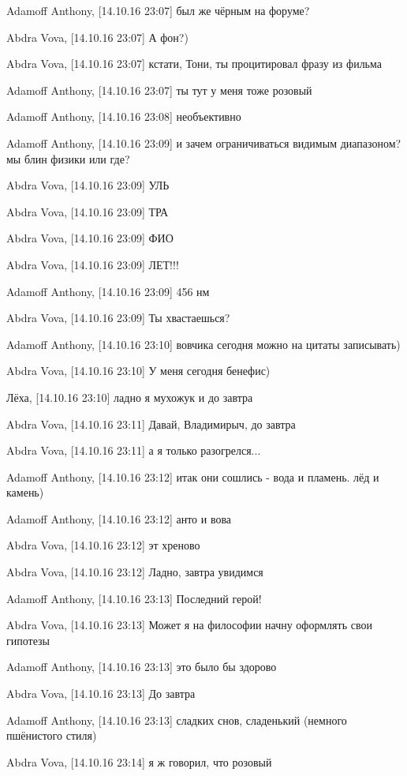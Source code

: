 Adamoff Anthony, [14.10.16 23:07]
был же чёрным на форуме?

Abdra Vova, [14.10.16 23:07]
А фон?)

Abdra Vova, [14.10.16 23:07]
кстати, Тони, ты процитировал фразу из фильма

Adamoff Anthony, [14.10.16 23:07]
ты тут у меня тоже розовый

Adamoff Anthony, [14.10.16 23:08]
необъективно

Adamoff Anthony, [14.10.16 23:09]
и зачем ограничиваться видимым диапазоном? мы блин физики или где?

Abdra Vova, [14.10.16 23:09]
УЛЬ

Abdra Vova, [14.10.16 23:09]
ТРА

Abdra Vova, [14.10.16 23:09]
ФИО

Abdra Vova, [14.10.16 23:09]
ЛЕТ!!!

Adamoff Anthony, [14.10.16 23:09]
456 нм

Abdra Vova, [14.10.16 23:09]
Ты хвастаешься?

Adamoff Anthony, [14.10.16 23:10]
вовчика сегодня можно на цитаты записывать)

Abdra Vova, [14.10.16 23:10]
У меня сегодня бенефис)

Лёха, [14.10.16 23:10]
ладно я мухожук
и до завтра

Abdra Vova, [14.10.16 23:11]
Давай, Владимирыч, до завтра

Abdra Vova, [14.10.16 23:11]
а я только разогрелся...

Adamoff Anthony, [14.10.16 23:12]
итак они сошлись - вода и пламень. лёд и камень)

Adamoff Anthony, [14.10.16 23:12]
анто и вова

Abdra Vova, [14.10.16 23:12]
эт хреново

Abdra Vova, [14.10.16 23:12]
Ладно, завтра увидимся

Adamoff Anthony, [14.10.16 23:13]
Последний герой!

Abdra Vova, [14.10.16 23:13]
Может я на философии начну оформлять свои гипотезы

Adamoff Anthony, [14.10.16 23:13]
это было бы здорово

Abdra Vova, [14.10.16 23:13]
До завтра

Adamoff Anthony, [14.10.16 23:13]
сладких снов, сладенький (немного пшёнистого стиля)

Abdra Vova, [14.10.16 23:14]
я ж говорил, что розовый

